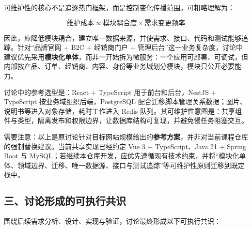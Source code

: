 \documentclass[UTF8,a4paper,11pt]{ctexart}
\newcommand{\resetconversation}{\gdef\wemovemainrolecode{0}}
\let\wemoveoriginalsubsection\subsection
\renewcommand{\subsection}{\resetconversation\wemoveoriginalsubsection}
\begin{document}
\begin{gptmsg}

可维护性的核心不是追逐热门框架，而是控制变化传播范围。可粗略理解为：

\[
\text{维护成本} \propto \text{模块耦合度} \times \text{需求变更频率}
\]

因此，应降低模块耦合，建立唯一数据来源，并使需求、接口、代码和测试能够追踪。针对“品牌官网 + B2C + 经销商门户 + 管理后台”这一业务复杂度，讨论中建议优先采用\textbf{模块化单体}，而非一开始拆为微服务：一个应用可部署、可调试，但内部按产品、订单、经销商、内容、身份等业务域划分模块，模块只公开必要能力。

讨论中的参考选型是：React + TypeScript 用于前台和后台，NestJS + TypeScript 按业务域组织后端，PostgreSQL 配合迁移脚本管理关系数据；图片、说明书等进入对象存储，耗时工作进入 Redis 队列。其可维护性意图是：共享组件与类型，隔离发布和权限边界，让数据库结构可复现，并避免慢任务阻塞交互。

需要注意：以上是原讨论针对目标网站规模给出的\textbf{参考方案}，并非对当前课程仓库的强制替换建议。当前共享实现已经约定 Vue 3 + TypeScript、Java 21 + Spring Boot 与 MySQL；若继续本仓库开发，应优先遵循现有技术约束，并将“模块化单体、领域边界、迁移、唯一数据源、接口与测试追踪”等可维护性原则迁移到既定栈中。

\end{gptmsg}

\newpage
\subsection*{三、讨论形成的可执行共识}

围绕后续需求分析、设计、实现与验证，讨论最终形成以下可执行共识：
\end{document}
